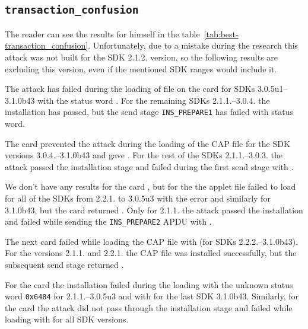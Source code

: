     \subsection{\texttt{transaction_confusion}}

            The reader can see the results for himself in the table~\ref{tab:best-transaction_confusion}. Unfortunately, due to a mistake during the research this attack was not built for the SDK 2.1.2. version, so the following results are excluding this version, even if the mentioned SDK ranges would include it.

            The attack has failed during the loading of \transactionconfusioncap file on the card \Acard for SDKs 3.0.5u1--3.1.0b43 with the status word \shortswwrongdata. For the remaining SDKs 2.1.1.--3.0.4. the installation has passed, but the send stage \texttt{INS_PREPARE1} has failed with \shortswunknown status word.

            The card \Bcard prevented the attack during the loading of the \transactionconfusioncap CAP file for the SDK versions 3.0.4.--3.1.0b43 and gave \shortswwrongdata. For the rest of the SDKs 2.1.1.--3.0.3. the attack passed the installation stage and failed during the first send stage with \shortswwrongdata.
        
        We don't have any results for the card \Ccard, but for the \Cnewcard the applet file failed to load for all of the SDKs from 2.2.1. to 3.0.5u3 with the error \shortswconditionsnotsatisfied and similarly for 3.1.0b43, but the card returned \shortswunknown. Only for 2.1.1. the attack passed the installation and failed while sending the \texttt{INS_PREPARE2} APDU with \shortswunknown.

        The next card \Dcard failed while loading the CAP file with \shortswwrongdata (for SDKs 2.2.2.--3.1.0b43). For the versions 2.1.1. and 2.2.1. the CAP file was installed successfully, but the subsequent send stage returned \shortswwrongdata.

        For the card \Gcard the installation failed during the loading with the unknown status word \texttt{0x6484} for 2.1.1.--3.0.5u3 and with \shortswwrongdata for the last SDK 3.1.0b43. Similarly, for the card \Icard the attack did not pass through the installation stage and failed while loading with \shortswconditionsnotsatisfied for all SDK versions.

